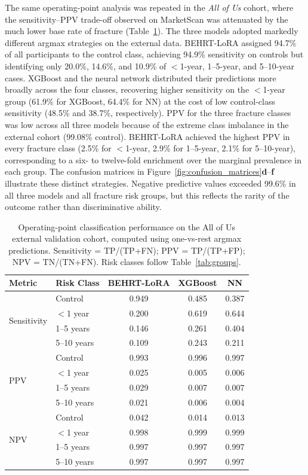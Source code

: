 \documentclass[12pt]{article}
\begin{document}
The same operating-point analysis was repeated in the \textit{All of Us} cohort, where the sensitivity--PPV trade-off observed on MarketScan was attenuated by the much lower base rate of fracture (Table~\ref{tab:aou_diagnostic_comparison}). The three models adopted markedly different argmax strategies on the external data. BEHRT-LoRA assigned 94.7\% of all participants to the control class, achieving 94.9\% sensitivity on controls but identifying only 20.0\%, 14.6\%, and 10.9\% of $<$1-year, 1--5-year, and 5--10-year cases. XGBoost and the neural network distributed their predictions more broadly across the four classes, recovering higher sensitivity on the $<$1-year group (61.9\% for XGBoost, 64.4\% for NN) at the cost of low control-class sensitivity (48.5\% and 38.7\%, respectively). PPV for the three fracture classes was low across all three models because of the extreme class imbalance in the external cohort (99.08\% control). BEHRT-LoRA achieved the highest PPV in every fracture class (2.5\% for $<$1-year, 2.9\% for 1--5-year, 2.1\% for 5--10-year), corresponding to a six- to twelve-fold enrichment over the marginal prevalence in each group. The confusion matrices in Figure~\ref{fig:confusion_matrices}\textbf{d}--\textbf{f} illustrate these distinct strategies. Negative predictive values exceeded 99.6\% in all three models and all fracture risk groups, but this reflects the rarity of the outcome rather than discriminative ability.

\begin{table}[H]
\centering
\caption{Operating-point classification performance on the All of Us external validation cohort, computed using one-vs-rest argmax predictions. Sensitivity = TP/(TP+FN); PPV = TP/(TP+FP); NPV = TN/(TN+FN). Risk classes follow Table~\ref{tab:groups}.}
\label{tab:aou_diagnostic_comparison}
\begin{tabular}{llccc}
\toprule
Metric & Risk Class & BEHRT-LoRA & XGBoost & NN \\
\midrule
\multirow{4}{*}{Sensitivity}
 & Control     & 0.949 & 0.485 & 0.387 \\
 & $<$1 year   & 0.200 & 0.619 & 0.644 \\
 & 1--5 years  & 0.146 & 0.261 & 0.404 \\
 & 5--10 years & 0.109 & 0.243 & 0.211 \\
\midrule
\multirow{4}{*}{PPV}
 & Control     & 0.993 & 0.996 & 0.997 \\
 & $<$1 year   & 0.025 & 0.005 & 0.006 \\
 & 1--5 years  & 0.029 & 0.007 & 0.007 \\
 & 5--10 years & 0.021 & 0.006 & 0.004 \\
\midrule
\multirow{4}{*}{NPV}
 & Control     & 0.042 & 0.014 & 0.013 \\
 & $<$1 year   & 0.998 & 0.999 & 0.999 \\
 & 1--5 years  & 0.997 & 0.997 & 0.997 \\
 & 5--10 years & 0.997 & 0.997 & 0.997 \\
\bottomrule
\end{tabular}
\end{table}
\end{document}

